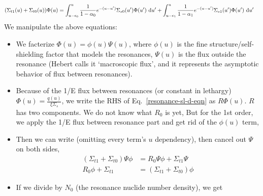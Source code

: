 \documentclass{school-22.211-notes}
\begin{document}
\begin{align}
(\Sigma_{t1}(u) + \Sigma_{t0} (u)) \Phi(u) &= \int_{u - \epsilon_0}^u \frac{1}{1 - \alpha_0} e^{-(u-u')} \Sigma_{s0}(u') \Phi(u') \mbox{ }\mathrm{d} u' + \int_{u-\epsilon_1}^u \frac{1}{1 - \alpha_1} e^{-(u-u')} \Sigma_{s1} (u') \Phi(u') \mbox{ }\mathrm{d} u'  
\end{align}
We manipulate the above equations:
\begin{itemize}
\item We facterize $\Phi(u) = \phi(u) \Psi(u)$, where $\phi(u)$ is the fine structure/self-shielding factor that models the resonances, $\Psi(u)$ is the flux outside the resonance (Hebert calls it `macroscopic flux', and it represents the asymptotic behavior of flux between resonances). 

\item Because of the 1/E flux between resonances (or constant in lethargy) $\Phi(u) = \frac{q(u)}{\xi \Sigma_s}$, we write the RHS of Eq.~\ref{resonance-sl-d-eqn} as $R \Phi(u)$. $R$ has two components. We do not know what $R_0$ is yet,
But for the 1st order, we apply the 1/E flux between resonance part and get rid of the $\phi(u)$ term, 

\item Then we can write (omitting every term's $u$ dependency), then cancel out $\Psi$ on both sides, 
\begin{align}
 (\Sigma_{t1} + \Sigma_{t0}) \Psi \phi &= R_0 \Psi \phi +  \Sigma_{t1} \Psi    \\
R_0 \phi + \Sigma_{t1} &= (\Sigma_{t1}  + \Sigma_{t0} ) \phi 
\end{align}

\item If we divide by $N_0$ (the resonance nuclide number density), we get 
\end{itemize}
\end{document}
